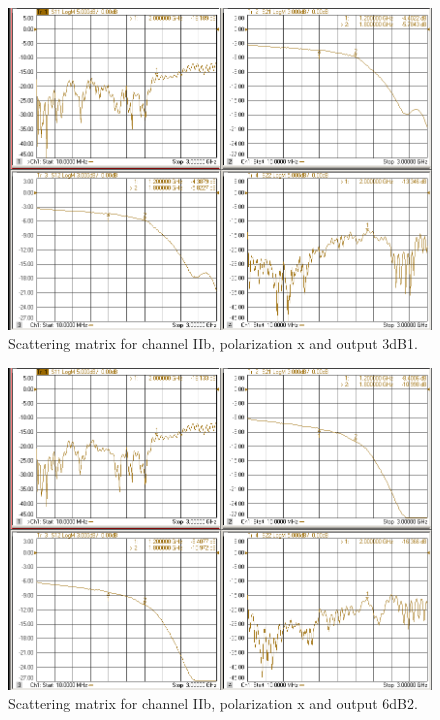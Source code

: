 \documentclass[12pt,a4paper,oneside]{article}
\begin{document}
\begin{figure}[H]
\centering
\includegraphics[width=0.9\linewidth]{VNA_results/IIbx_3dB1.png}
\caption{Scattering matrix for channel IIb, polarization x and output 3dB1.}
\label{fig:IIbx_3dB1}
\end{figure}


\begin{figure}[H]
\centering
\includegraphics[width=0.9\linewidth]{VNA_results/IIbx_6dB2.png}
\caption{Scattering matrix for channel IIb, polarization x and output 6dB2.}
\label{fig:IIbx_6dB2}
\end{figure}
\end{document}

